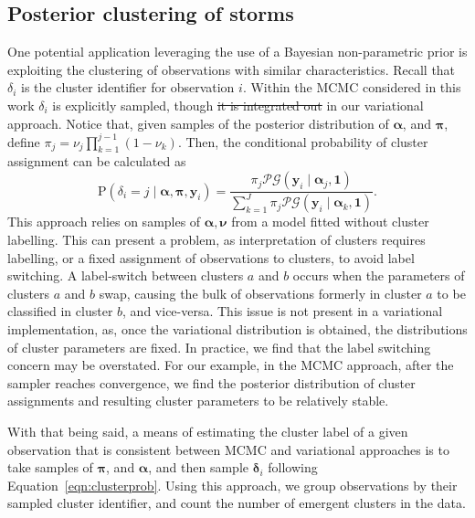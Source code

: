 \subsection{Posterior clustering of storms}
One potential application leveraging the use of a Bayesian non-parametric prior is 
    exploiting the clustering of observations with similar characteristics.  
    Recall that $\delta_i$ is the cluster identifier for observation $i$. Within the 
    MCMC considered in this work $\delta_i$ is explicitly sampled, though 
    \st{it is integrated out} in our variational approach. Notice that, given
    samples of the posterior distribution of $\bm{\alpha}$, and $\bm{\pi}$, 
    define $\pi_j = \nu_j\prod_{k = 1}^{j-1}(1 - \nu_k)$. Then, the conditional 
    probability of cluster assignment can be calculated as
    \begin{equation}
        \label{eqn:clusterprob}
        \text{P}\left(\delta_i = j\mid\bm{\alpha},\bm{\pi},\bm{y}_i\right) 
            = \frac{\pi_j\mathcal{PG}(\bm{y}_i\mid\bm{\alpha}_j,\bm{1})}{
            \sum_{k = 1}^J \pi_j\mathcal{PG}(\bm{y}_i\mid\bm{\alpha}_k,\bm{1})}.
    \end{equation}
    This approach relies on samples of $\bm{\alpha},\bm{\nu}$ from a model fitted without 
    cluster labelling. This can present a problem, as interpretation of clusters requires 
    labelling, or a fixed assignment of observations to clusters, to avoid label switching.
    A label-switch between clusters $a$ and $b$ occurs when the parameters of clusters 
    $a$ and $b$ swap, causing the bulk of observations formerly in cluster $a$ to be 
    classified in cluster $b$, and vice-versa. This issue is not present in a variational 
    implementation, as, once the variational distribution is obtained, the distributions 
    of cluster parameters are fixed.  In practice, we find that the label switching 
    concern may be overstated.  For our example, in the MCMC approach,
    after the sampler reaches convergence, we find the posterior distribution of 
    cluster assignments and resulting cluster parameters to be relatively stable.

With that being said, a means of estimating the cluster label of a given observation that 
    is consistent between MCMC and variational approaches is to take samples of $\bm{\pi}$, 
    and $\bm{\alpha}$, and then sample $\bm{\delta}_i$ following Equation~\eqref{eqn:clusterprob}.  
    Using this approach, we group observations by their sampled cluster identifier, and count 
    the number of emergent clusters in the data.

